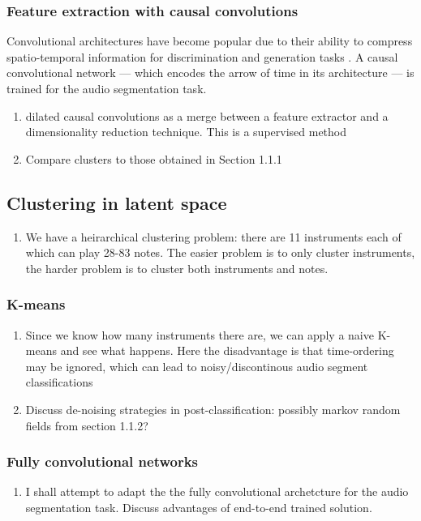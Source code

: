 \documentclass{article}[12pt]
\numberwithin{equation}{section}
\begin{document}
\subsubsection{Feature extraction with causal convolutions}
Convolutional architectures have become popular due to their ability to compress spatio-temporal
information for discrimination and generation tasks \cite{Oord2016a,Goodfellow}.
A causal convolutional network \cite{Oord2016} --- which encodes the arrow of time in
its architecture --- is trained for the audio segmentation task.
\begin{enumerate}
	\item dilated causal convolutions as a merge between a feature
	extractor and a dimensionality reduction technique. This is a supervised method
	\item Compare clusters to those obtained in Section 1.1.1
\end{enumerate}
\subsection{Clustering in latent space}
\begin{enumerate}
	\item We have a heirarchical clustering problem: there are 11 instruments each
	of which can play 28-83 notes. The easier problem is to only cluster instruments,
	the harder problem is to cluster both instruments and notes.
\end{enumerate}

\subsubsection{K-means}

\begin{enumerate}
	\item Since we know how many instruments there are, we can apply a naive K-means
	and see what happens. Here the disadvantage is that time-ordering may be
	ignored, which can lead to noisy/discontinous audio segment classifications
	\item Discuss de-noising strategies in post-classification: possibly markov
	random fields from section 1.1.2?
\end{enumerate}

\subsubsection{Fully convolutional networks}
\begin{enumerate}
	\item I shall attempt to adapt the the fully convolutional archetcture \cite{Long2015}
	for the audio segmentation task. Discuss advantages of end-to-end trained solution.
\end{enumerate}
\end{document}
